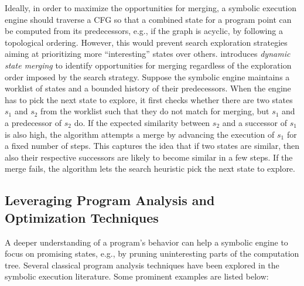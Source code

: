 
 Ideally, in order to maximize the opportunities for merging, a symbolic execution engine should traverse a CFG so that a combined state for a program point can be computed from its predecessors, e.g., if the graph is acyclic, by following a topological ordering. However, this would prevent search exploration strategies aiming at prioritizing more ``interesting'' states over others. \cite{KKB-PLDI12} introduces {\em dynamic state merging} to identify opportunities for merging regardless of the exploration order imposed by the search strategy.
Suppose the symbolic engine maintains a worklist of states and a bounded history of their predecessors. When the engine has to pick the next state to explore, it first checks whether there are two states $s_1$ and $s_2$ from the worklist such that they do not match for merging, but $s_1$ and a predecessor of $s_2$ do. If the expected similarity between $s_2$ and a successor of $s_1$ is also high, the algorithm attempts a merge by advancing the execution of $s_1$ for a fixed number of steps. This captures the idea that if two states are similar, then also their respective successors are likely to become similar in a few steps. If the merge fails, the algorithm lets the search heuristic pick the next state to explore.


\subsection{Leveraging Program Analysis and Optimization Techniques}
\label{ss:program-analysis}

A deeper understanding of a program's behavior can help a symbolic engine to focus on promising states, e.g., by pruning uninteresting parts of the computation tree. Several classical program analysis techniques have been explored in the symbolic execution literature. Some prominent examples are listed below:

